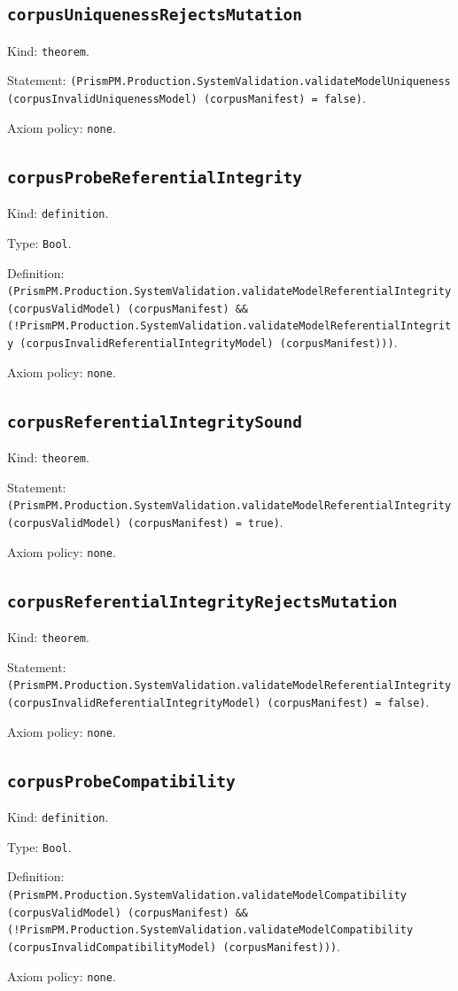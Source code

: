 \documentclass[11pt]{article}
\begin{document}
\subsection*{\texttt{corpusUniquenessRejectsMutation}}
\noindent Kind: \texttt{theorem}.\par
\noindent Statement: \texttt{(PrismPM.Production.SystemValidation.validateModelUniqueness (corpusInvalidUniquenessModel) (corpusManifest) = false)}.\par
\noindent Axiom policy: \texttt{none}.\par
\subsection*{\texttt{corpusProbeReferentialIntegrity}}
\noindent Kind: \texttt{definition}.\par
\noindent Type: \texttt{Bool}.\par
\noindent Definition: \texttt{(PrismPM.Production.SystemValidation.validateModelReferentialIntegrity (corpusValidModel) (corpusManifest) \&\& (!PrismPM.Production.SystemValidation.validateModelReferentialIntegrity (corpusInvalidReferentialIntegrityModel) (corpusManifest)))}.\par
\noindent Axiom policy: \texttt{none}.\par
\subsection*{\texttt{corpusReferentialIntegritySound}}
\noindent Kind: \texttt{theorem}.\par
\noindent Statement: \texttt{(PrismPM.Production.SystemValidation.validateModelReferentialIntegrity (corpusValidModel) (corpusManifest) = true)}.\par
\noindent Axiom policy: \texttt{none}.\par
\subsection*{\texttt{corpusReferentialIntegrityRejectsMutation}}
\noindent Kind: \texttt{theorem}.\par
\noindent Statement: \texttt{(PrismPM.Production.SystemValidation.validateModelReferentialIntegrity (corpusInvalidReferentialIntegrityModel) (corpusManifest) = false)}.\par
\noindent Axiom policy: \texttt{none}.\par
\subsection*{\texttt{corpusProbeCompatibility}}
\noindent Kind: \texttt{definition}.\par
\noindent Type: \texttt{Bool}.\par
\noindent Definition: \texttt{(PrismPM.Production.SystemValidation.validateModelCompatibility (corpusValidModel) (corpusManifest) \&\& (!PrismPM.Production.SystemValidation.validateModelCompatibility (corpusInvalidCompatibilityModel) (corpusManifest)))}.\par
\noindent Axiom policy: \texttt{none}.\par
\end{document}
